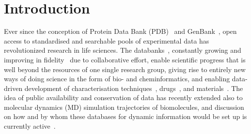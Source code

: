 \documentclass[journal=jpcbfk,manuscript=article,layout=twocolumn]{achemso}
\begin{document}
\section{Introduction}
Ever since the conception of Protein Data Bank (PDB)~\cite{nnb1971,wwPDB2019} and GenBank~\cite{jordan1982,sayers2020},
open access to standardised and searchable pools of experimental data has
revolutionized
research in life sciences.
The databanks~\cite{Gaber:2019a}, constantly growing and improving in fidelity~\cite{hobohm1992,levitt2007,meszaros2019}
due to collaborative effort, enable scientific progress that is well beyond the resources of one single research group, giving rise to entirely new ways of doing science in the form of bio- and cheminformatics, and enabling data-driven development of 
characterisation techniques~\cite{burley2018}, %
drugs~\cite{kirchmair08}, and materials~\cite{huang2016}.
%
%
The idea of public availability and conservation of data has recently extended also to molecular dynamics (MD) simulation trajectories of biomolecules, and discussion on how and by whom these databases for dynamic information would be set up is currently active~\cite{Hildebrand:2019a,Abraham:2019a,Gygli:2020a,Abriata:2020a,Hospital:2020a}.
%
\end{document}
